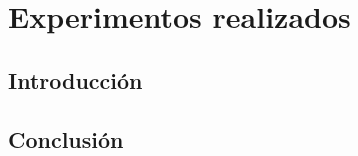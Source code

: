 
\chapter{Experimentos realizados}

\label{chap6:experimentos}

\section{Introducción}

\section{Conclusión}
